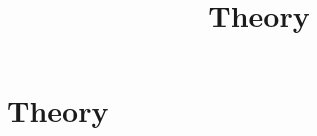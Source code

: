 \documentclass[../../OAE-SPEC-MAIN.tex]{subfiles}
\title{Theory}
\begin{document}
\chapter{Theory}



\clearpage

\clearpage

\clearpage

\clearpage

\clearpage

\clearpage

\end{document}
